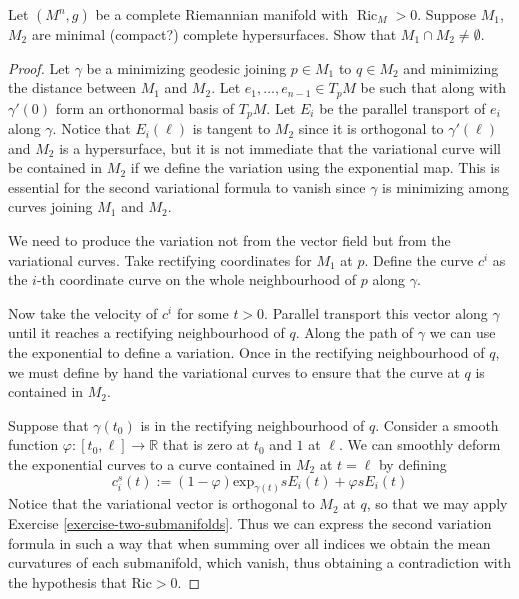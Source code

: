 \begin{exercise}
\label{exercise-intersecting-minimal-hypersurfaces}
Let $(M^n,g)$ be a complete Riemannian manifold with $\operatorname{Ric}_M>0$. 
Suppose $M_1$, $M_2$ are minimal (compact?) complete hypersurfaces. Show that 
$M_1 \cap M_2 \neq \emptyset$.
\end{exercise}

\begin{proof}

Let $\gamma$ be a minimizing geodesic joining $p \in M_1$ to $q\in M_2$ and
minimizing the distance between $M_1$ and $M_2$. Let $e_1,\ldots,e_{n-1}\in
T_pM$ be such that along with $\gamma'(0)$ form an orthonormal basis of $T_pM$.
Let $E_i$ be the parallel transport of $e_i$ along $\gamma$. Notice that
$E_i(\ell)$ is tangent to $M_2$ since it is orthogonal to $\gamma'(\ell)$ and
$M_2$ is a hypersurface, but it is not immediate that the variational curve will
be contained in $M_2$ if we define the variation using the exponential map. This
is essential for the second variational formula to vanish since $\gamma$ is
minimizing among curves joining $M_1$ and $M_2$.

We need to produce the variation not from the vector field but from the
variational curves. Take rectifying coordinates for $M_1$ at $p$. Define the
curve $c^i$ as the $i$-th coordinate curve on the whole neighbourhood of $p$
along $\gamma$.

Now take the velocity of $c^i$ for some $t>0$. Parallel transport this vector
along $\gamma$ until it reaches a rectifying neighbourhood of $q$. Along the
path of $\gamma$ we can use the exponential to define a variation. Once in the
rectifying neighbourhood of $q$, we must define by hand the variational curves
to ensure that the curve at $q$ is contained in $M_2$.

Suppose that $\gamma(t_0)$ is in the rectifying neighbourhood of $q$. Consider a
smooth function $\varphi:[t_0,\ell]\to \mathbb{R}$ that is zero at $t_0$ and $1$
at $\ell$. We can smoothly deform the exponential curves to a curve contained in
$M_2$ at $t=\ell$ by defining 
$$
c^s_i(t):=(1-\varphi)\text{exp}_{\gamma(t)}sE_i(t)+\varphi sE_i(t)
$$ 
Notice that the variational vector is orthogonal to $M_2$ at $q$, so that we may
apply Exercise \ref{exercise-two-submanifolds}. Thus we can express the second
variation formula in such a way that when summing over all indices we obtain the
mean curvatures of each submanifold, which vanish, thus obtaining a
contradiction with the hypothesis that $\text{Ric}>0$.
\end{proof}


